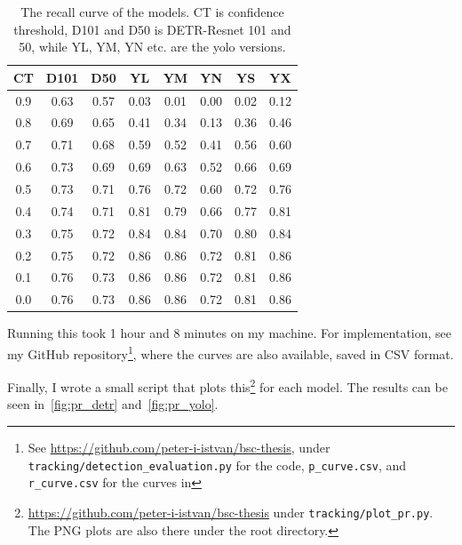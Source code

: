 \begin{table}
    \begin{centering}
    \begin{tabular}{|c||c|c|c|c|c|c|c|}
        \hline
        CT & D101 & D50 & YL & YM & YN & YS & YX \\
        \hline
        \hline
        0.9 & 0.63 & 0.57 & 0.03 & 0.01 & 0.00 & 0.02 & 0.12 \\
        \hline 
        0.8 & 0.69 & 0.65 & 0.41 & 0.34 & 0.13 & 0.36 & 0.46 \\
        \hline 
        0.7 & 0.71 & 0.68 & 0.59 & 0.52 & 0.41 & 0.56 & 0.60 \\
        \hline 
        0.6 & 0.73 & 0.69 & 0.69 & 0.63 & 0.52 & 0.66 & 0.69 \\
        \hline 
        0.5 & 0.73 & 0.71 & 0.76 & 0.72 & 0.60 & 0.72 & 0.76 \\
        \hline 
        0.4 & 0.74 & 0.71 & 0.81 & 0.79 & 0.66 & 0.77 & 0.81 \\
        \hline 
        0.3 & 0.75 & 0.72 & 0.84 & 0.84 & 0.70 & 0.80 & 0.84 \\
        \hline 
        0.2 & 0.75 & 0.72 & 0.86 & 0.86 & 0.72 & 0.81 & 0.86 \\
        \hline 
        0.1 & 0.76 & 0.73 & 0.86 & 0.86 & 0.72 & 0.81 & 0.86 \\
        \hline 
        0.0 & 0.76 & 0.73 & 0.86 & 0.86 & 0.72 & 0.81 & 0.86 \\
        \hline
    \end{tabular}
    \caption{The recall curve of the models. CT is confidence threshold, D101 and D50 is DETR-Resnet 101 and 50, while YL, YM, YN etc. are the yolo versions.}
    \label{tab:r_curve}
    \end{centering}
\end{table}

Running this took 1 hour and 8 minutes on my machine. For implementation, see my GitHub repository\footnote{See \url{https://github.com/peter-i-istvan/bsc-thesis}, under \texttt{tracking/detection\_evaluation.py} for the code, \texttt{p\_curve.csv}, and \texttt{r\_curve.csv} for the curves in }, where the curves are also available, saved in CSV format.

Finally, I wrote a small script that plots this\footnote{\url{https://github.com/peter-i-istvan/bsc-thesis} under \texttt{tracking/plot\_pr.py}. The PNG plots are also there under the root directory.} for each model. The results can be seen in~\ref{fig:pr_detr} and~\ref{fig:pr_yolo}. 

